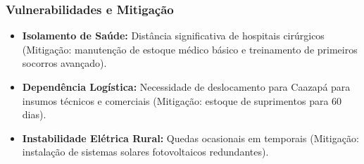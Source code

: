 \subsubsection{Vulnerabilidades e
Mitigação}

\begin{itemize}
\tightlist
\item
  \textbf{Isolamento de Saúde:} Distância significativa de hospitais
  cirúrgicos (Mitigação: manutenção de estoque médico básico e
  treinamento de primeiros socorros avançado).
\item
  \textbf{Dependência Logística:} Necessidade de deslocamento para
  Caazapá para insumos técnicos e comerciais (Mitigação: estoque de
  suprimentos para 60 dias).
\item
  \textbf{Instabilidade Elétrica Rural:} Quedas ocasionais em temporais
  (Mitigação: instalação de sistemas solares fotovoltaicos redundantes).
\end{itemize}


